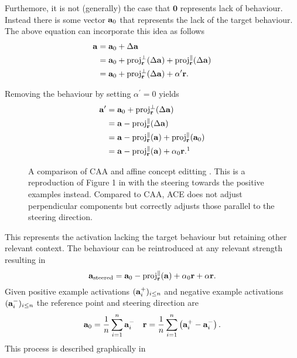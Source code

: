 Furthemore, it is not (generally) the case that $\mathbf{0}$ represents lack of behaviour.
Instead there is some vector $\mathbf{a}_0$ that represents the lack of the target behaviour.
The above equation can incorporate this idea as follows
\begin{align*}
    \mathbf{a} &= \mathbf{a}_0 + \Delta\mathbf{a} \\
        &= \mathbf{a}_0 + \text{proj}_{\mathbf{r}}^{\perp}(\Delta\mathbf{a}) + \text{proj}_{\mathbf{r}}^{\parallel}(\Delta\mathbf{a}) \\
        &= \mathbf{a}_0 + \text{proj}_{\mathbf{r}}^{\perp}(\Delta\mathbf{a}) + \alpha^\prime\mathbf{r}.
\end{align*}

Removing the behaviour by setting $\alpha^\prime = 0$ yields
\begin{align*}
    \va^\prime &= \va_0 + \text{proj}_\vr^{\perp}(\Delta\va) \\
               &= \va - \text{proj}_\vr^{\parallel}(\Delta\va) \\
               &= \va - \text{proj}_\vr^{\parallel}(\va) + \text{proj}_\vr^{\parallel}(\va_0) \\
               &= \va - \text{proj}_\vr^{\parallel}(\va) + \alpha_0\vr.\footnotemark[1]
\end{align*}

\begin{figure}
    \centering
    \captionsetup{width=.9\textwidth}
    
    \caption{A comparison of CAA \citep{caa} and affine concept editting \citep{ace}. This is a reproduction of Figure 1 in \citet{ace} with the steering towards the positive examples instead. Compared to CAA, ACE does not adjust perpendicular components but correctly adjusts those parallel to the steering direction.}
    \label{fig:ace}
\end{figure}

This represents the activation lacking the target behaviour but retaining other relevant context.
The behaviour can be reintroduced at any relevant strength resulting in
\begin{equation}
    \label{eq:ace}
    \mathbf{a}_\text{steered} = \mathbf{a}_0 - \text{proj}_{\mathbf{r}}^{\parallel}(\mathbf{a}) + \alpha_0\mathbf{r} + \alpha\mathbf{r}.
\end{equation}
Given positive example activations $(\mathbf{a}_i^+)_{i\le n}$ and negative example activations $(\mathbf{a}_i^-)_{i\le n}$ the reference point and steering direction are
\begin{align*}
    \mathbf{a}_0 = \frac{1}{n}\sum_{i=1}^{n}\mathbf{a}_i^- && \mathbf{r} = \frac{1}{n}\sum_{i=1}^{n}\left(\mathbf{a}_i^+ - \mathbf{a}_i^-\right).
\end{align*}
This process is described graphically in 

